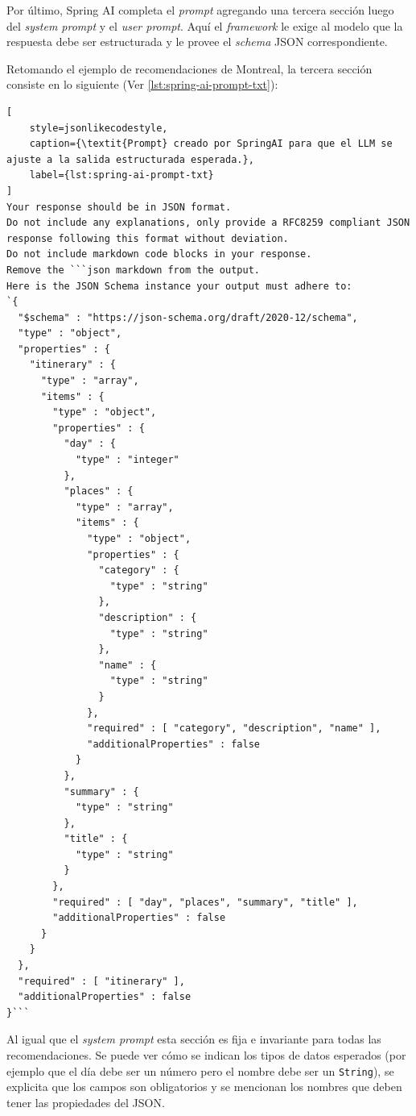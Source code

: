 Por último, Spring AI completa el \textit{prompt} agregando una tercera sección luego del \textit{system prompt} y el
\textit{user prompt}.
Aquí el \textit{framework} le exige al modelo que la respuesta debe ser estructurada y le provee el \textit{schema}
JSON correspondiente.

Retomando el ejemplo de recomendaciones de Montreal, la tercera sección consiste en lo siguiente
(Ver \autoref{lst:spring-ai-prompt-txt}):

\begin{lstlisting}[
    style=jsonlikecodestyle,
    caption={\textit{Prompt} creado por SpringAI para que el LLM se ajuste a la salida estructurada esperada.},
    label={lst:spring-ai-prompt-txt}
]
Your response should be in JSON format.
Do not include any explanations, only provide a RFC8259 compliant JSON response following this format without deviation.
Do not include markdown code blocks in your response.
Remove the ```json markdown from the output.
Here is the JSON Schema instance your output must adhere to:
`{
  "$schema" : "https://json-schema.org/draft/2020-12/schema",
  "type" : "object",
  "properties" : {
    "itinerary" : {
      "type" : "array",
      "items" : {
        "type" : "object",
        "properties" : {
          "day" : {
            "type" : "integer"
          },
          "places" : {
            "type" : "array",
            "items" : {
              "type" : "object",
              "properties" : {
                "category" : {
                  "type" : "string"
                },
                "description" : {
                  "type" : "string"
                },
                "name" : {
                  "type" : "string"
                }
              },
              "required" : [ "category", "description", "name" ],
              "additionalProperties" : false
            }
          },
          "summary" : {
            "type" : "string"
          },
          "title" : {
            "type" : "string"
          }
        },
        "required" : [ "day", "places", "summary", "title" ],
        "additionalProperties" : false
      }
    }
  },
  "required" : [ "itinerary" ],
  "additionalProperties" : false
}```
\end{lstlisting}

Al igual que el \textit{system prompt} esta sección es fija e invariante para todas las recomendaciones.
Se puede ver cómo se indican los tipos de datos esperados (por ejemplo que el día debe ser un número pero el nombre debe
ser un \texttt{String}), se explicita que los campos son obligatorios y se mencionan los nombres que deben tener las
propiedades del JSON\@.

